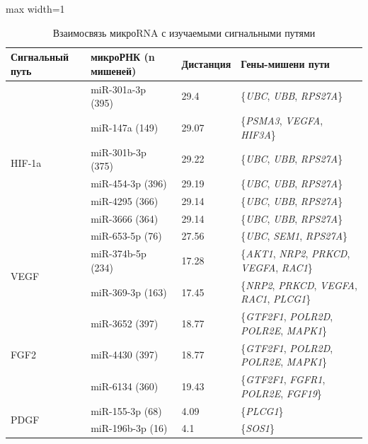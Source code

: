 \begin{table}[ht]
    \centering
    \caption{Взаимосвязь микроRNA с изучаемыми сигнальными путями}
    \label{tab:mirna_pathways}
    \begin{adjustbox}{max width=1\textwidth}
    \begin{tabular}{p{3cm}lll}
    \toprule
    \textbf{Сигнальный путь} & \textbf{микроРНК (n мишеней)} & \textbf{Дистанция} & \textbf{Гены-мишени пути} \\
    \midrule
    
    \multirow{7}{*}{HIF-1a} & miR-301a-3p (395) & 29.4 & \{\textit{UBC}, \textit{UBB}, \textit{RPS27A}\} \\
     & miR-147a (149) & 29.07 & \{\textit{PSMA3}, \textit{VEGFA}, \textit{HIF3A}\} \\
     & miR-301b-3p (375) & 29.22 & \{\textit{UBC}, \textit{UBB}, \textit{RPS27A}\} \\
     & miR-454-3p (396) & 29.19 & \{\textit{UBC}, \textit{UBB}, \textit{RPS27A}\} \\
     & miR-4295 (366) & 29.14 & \{\textit{UBC}, \textit{UBB}, \textit{RPS27A}\} \\
     & miR-3666 (364) & 29.14 & \{\textit{UBC}, \textit{UBB}, \textit{RPS27A}\} \\
     & miR-653-5p (76) & 27.56 & \{\textit{UBC}, \textit{SEM1}, \textit{RPS27A}\} \\
    \midrule
    
    \multirow{2}{*}{VEGF} & miR-374b-5p (234) & 17.28 & \{\textit{AKT1}, \textit{NRP2}, \textit{PRKCD}, \textit{VEGFA}, \textit{RAC1}\} \\
     & miR-369-3p (163) & 17.45 & \{\textit{NRP2}, \textit{PRKCD}, \textit{VEGFA}, \textit{RAC1}, \textit{PLCG1}\} \\
    \midrule
    
    \multirow{3}{*}{FGF2} & miR-3652 (397) & 18.77 & \{\textit{GTF2F1}, \textit{POLR2D}, \textit{POLR2E}, \textit{MAPK1}\} \\
     & miR-4430 (397) & 18.77 & \{\textit{GTF2F1}, \textit{POLR2D}, \textit{POLR2E}, \textit{MAPK1}\} \\
     & miR-6134 (360) & 19.43 & \{\textit{GTF2F1}, \textit{FGFR1}, \textit{POLR2E}, \textit{FGF19}\} \\
    \midrule
    
    \multirow{2}{*}{PDGF} & miR-155-3p (68) & 4.09 & \{\textit{PLCG1}\} \\
     & miR-196b-3p (16) & 4.1 & \{\textit{SOS1}\} \\
    \midrule
    

\end{tabular}
\end{adjustbox}
\end{table}
